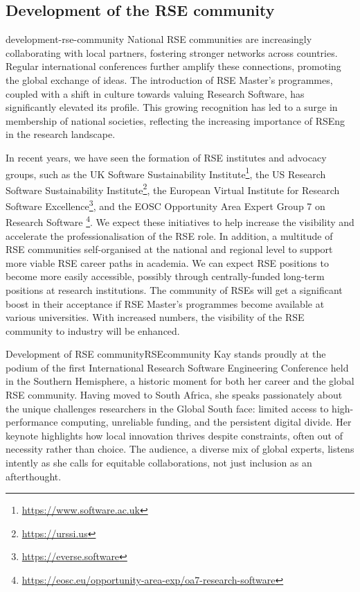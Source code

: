 \documentclass{eceasst}
\begin{document}
\subsection{Development of the RSE community}
\begin{whatis}{}{development-rse-community}
National RSE communities are increasingly collaborating with local partners,
fostering stronger networks across countries.
Regular international conferences further amplify these connections,
promoting the global exchange of ideas. The introduction of RSE Master's programmes,
coupled with a shift in culture towards valuing Research Software,
has significantly elevated its profile.
This growing recognition has led to a surge in membership of national societies,
reflecting the increasing importance of RSEng in the research landscape.
\end{whatis}
In recent years, we have seen the formation of RSE institutes and advocacy groups, such as
the UK Software Sustainability Institute\footnote{\url{https://www.software.ac.uk}},
the US Research Software Sustainability Institute\footnote{\url{https://urssi.us}},
the European Virtual Institute for Research Software Excellence\footnote{\url{https://everse.software}},
and the EOSC Opportunity Area Expert Group 7 on Research Software%
\footnote{\url{https://eosc.eu/opportunity-area-exp/oa7-research-software}}.
We expect these initiatives to help increase the visibility and accelerate
the professionalisation of the RSE role.
In addition, a multitude of RSE communities self-organised at the national
and regional level to support more viable RSE career paths in academia.
We can expect RSE positions to become more easily accessible,
possibly through centrally-funded long-term positions at research institutions.
The community of RSEs will get a significant boost in their acceptance
if RSE Master's programmes become available at various universities.
With increased numbers, the visibility of the RSE community to industry will be enhanced.
\begin{story}{Development of RSE community}{RSEcommunity}
Kay stands proudly at the podium of the first International Research
Software Engineering Conference held in the Southern Hemisphere,
a historic moment for both her career and the global RSE community.
Having moved to South Africa, she speaks passionately about the unique
challenges researchers in the Global South face: limited access
to high-performance computing, unreliable funding,
and the persistent digital divide.
Her keynote highlights how local innovation thrives despite constraints,
often out of necessity rather than choice.
The audience, a diverse mix of global experts, listens intently as she calls
for equitable collaborations, not just inclusion as an afterthought.
\end{story}
\end{document}
